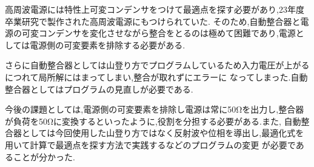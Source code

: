 \documentclass[uplatex, 12pt]{ujbook}
\begin{document}
高周波電源には特性上可変コンデンサをつけて最適点を探す必要があり,23年度卒業研究で製作された高周波電源にもつけられていた.
そのため,自動整合器と電源の可変コンデンサを変化させながら整合をとるのは極めて困難であり,電源としては電源側の可変要素を排除する必要がある.

さらに自動整合器としては山登り方でプログラムしているため入力電圧が上がるにつれて局所解にはまってしまい,整合が取れずにエラーに
なってしまった.自動整合器としてはプログラムの見直しが必要である.

今後の課題としては,電源側の可変要素を排除し電源は常に50Ωを出力し,整合器が負荷を50Ωに変換するといったように,役割を分担する必要がある.また,
自動整合器としては今回使用した山登り方ではなく反射波や位相を導出し,最適化式を用いて計算で最適点を探す方法で実践するなどのプログラムの変更
が必要であることが分かった.
\end{document}
